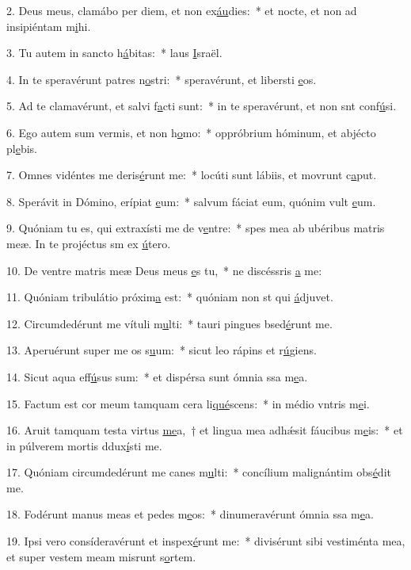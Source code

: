 2. Deus meus, clamábo per diem, et non ex\uline{áu}dies:~* et nocte, et non ad insipiéntam m\uline{i}hi.\par 
3. Tu autem in sancto h\uline{á}bitas:~* laus \uline{I}sraël.\par 
4. In te speravérunt patres n\uline{o}stri:~* speravérunt, et libersti \uline{e}os.\par 
5. Ad te clamavérunt, et salvi f\uline{a}cti sunt:~* in te speravérunt, et non snt conf\uline{ú}si.\par 
6. Ego autem sum vermis, et non h\uline{o}mo:~* oppróbrium hóminum, et abjécto pl\uline{e}bis.\par 
7. Omnes vidéntes me deris\uline{é}runt me:~* locúti sunt lábiis, et movrunt c\uline{a}put.\par 
8. Sperávit in Dómino, erípiat \uline{e}um:~* salvum fáciat eum, quónim vult \uline{e}um.\par 
9. Quóniam tu es, qui extraxísti me de v\uline{e}ntre:~* spes mea ab ubéribus matris meæ. In te projéctus sm ex \uline{ú}tero.\par 
10. De ventre matris meæ Deus meus \uline{e}s tu,~* ne discéssris \uline{a} me:\par 
11. Quóniam tribulátio próxim\uline{a} est:~* quóniam non st qui \uline{á}djuvet.\par 
12. Circumdedérunt me vítuli m\uline{u}lti:~* tauri pingues bsed\uline{é}runt me.\par 
13. Aperuérunt super me os s\uline{u}um:~* sicut leo rápins et r\uline{ú}giens.\par 
14. Sicut aqua eff\uline{ú}sus sum:~* et dispérsa sunt ómnia ssa m\uline{e}a.\par 
15. Factum est cor meum tamquam cera li\uline{qué}scens:~* in médio vntris m\uline{e}i.\par 
16. Aruit tamquam testa virtus \uline{me}a,~† et lingua mea adhǽsit fáucibus m\uline{e}is:~* et in púlverem mortis ddux\uline{í}sti me.\par 
17. Quóniam circumdedérunt me canes m\uline{u}lti:~* concílium malignántim obs\uline{é}dit me.\par 
18. Fodérunt manus meas et pedes m\uline{e}os:~* dinumeravérunt ómnia ssa m\uline{e}a.\par 
19. Ipsi vero consíderavérunt et inspex\uline{é}runt me:~* divisérunt sibi vestiménta mea, et super vestem meam misrunt s\uline{o}rtem.\par 
